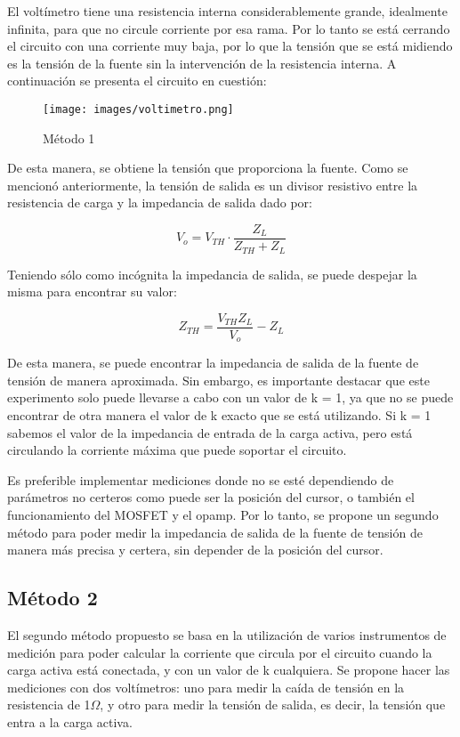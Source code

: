 \documentclass[12pt,oneside,a4paper]{article}
\begin{document}
El voltímetro tiene una resistencia interna 
considerablemente grande, idealmente infinita, para que no circule corriente por esa rama. 
Por lo tanto se está cerrando el circuito con una corriente muy baja, por lo que la tensión 
que se está midiendo es la tensión de la fuente sin la intervención de la resistencia interna.
A continuación se presenta el circuito en cuestión:

\begin{figure}[H]
    \centering
    \texttt{[image: images/voltimetro.png]}
    \caption{Método 1}
\end{figure}

De esta manera, se obtiene la tensión que proporciona la fuente. Como se mencionó anteriormente, 
la tensión de salida es un divisor resistivo entre la resistencia de carga y la impedancia de salida
dado por:

\begin{equation}
    V_o = V_{TH} \cdot \frac{Z_{L}}{Z_{TH} + Z_L}
\end{equation}

Teniendo sólo como incógnita la impedancia de salida, se puede despejar la misma para encontrar su 
valor:

\begin{equation}
    Z_{TH} = \frac{V_{TH}Z_L}{V_o} - Z_L
\end{equation}

De esta manera, se puede encontrar la impedancia de salida de la fuente de tensión de manera aproximada. 
Sin embargo, es importante destacar que este experimento solo puede llevarse a cabo con un valor de 
k = 1, ya que no se puede encontrar de otra manera el valor de k exacto que se está utilizando.
Si k = 1 sabemos el valor de la impedancia de entrada de la carga activa, pero está circulando la 
corriente máxima que puede soportar el circuito. 

Es preferible implementar mediciones donde no se esté dependiendo de parámetros no certeros como 
puede ser la posición del cursor, o también el funcionamiento del MOSFET y el opamp. Por lo tanto, 
se propone un segundo método para poder medir la impedancia de salida de la fuente de tensión 
de manera más precisa y certera, sin depender de la posición del cursor.

\subsection*{Método 2}

El segundo método propuesto se basa en la utilización de varios instrumentos de medición para poder 
calcular la corriente que circula por el circuito cuando la carga activa está conectada, y con un 
valor de k cualquiera. Se propone hacer las mediciones con dos voltímetros: uno para medir la caída de 
tensión en la resistencia de 1$\Omega$, y otro para medir la tensión de salida, es decir, la tensión que 
entra a la carga activa.
\end{document}
